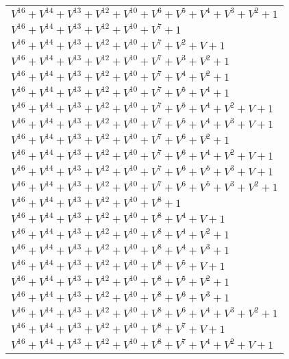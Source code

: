 \documentclass[12pt]{article}
\begin{document}
\begin{adjustwidth}{-4cm}{}
\begin{center}
\begin{longtable}{|l|}
$V^{16}  +V^{14}  +V^{13}  +V^{12}  +V^{10}  +V^{6}  +V^{5}  +V^{4}  +V^{3}  +V^{2}  + 1$ \\
$V^{16}  +V^{14}  +V^{13}  +V^{12}  +V^{10}  +V^{7}  + 1$ \\
$V^{16}  +V^{14}  +V^{13}  +V^{12}  +V^{10}  +V^{7}  +V^{2}  + V + 1$ \\
$V^{16}  +V^{14}  +V^{13}  +V^{12}  +V^{10}  +V^{7}  +V^{3}  +V^{2}  + 1$ \\
$V^{16}  +V^{14}  +V^{13}  +V^{12}  +V^{10}  +V^{7}  +V^{4}  +V^{2}  + 1$ \\
$V^{16}  +V^{14}  +V^{13}  +V^{12}  +V^{10}  +V^{7}  +V^{5}  +V^{4}  + 1$ \\
$V^{16}  +V^{14}  +V^{13}  +V^{12}  +V^{10}  +V^{7}  +V^{5}  +V^{4}  +V^{2}  + V + 1$ \\
$V^{16}  +V^{14}  +V^{13}  +V^{12}  +V^{10}  +V^{7}  +V^{5}  +V^{4}  +V^{3}  + V + 1$ \\
$V^{16}  +V^{14}  +V^{13}  +V^{12}  +V^{10}  +V^{7}  +V^{6}  +V^{2}  + 1$ \\
$V^{16}  +V^{14}  +V^{13}  +V^{12}  +V^{10}  +V^{7}  +V^{6}  +V^{4}  +V^{2}  + V + 1$ \\
$V^{16}  +V^{14}  +V^{13}  +V^{12}  +V^{10}  +V^{7}  +V^{6}  +V^{5}  +V^{3}  + V + 1$ \\
$V^{16}  +V^{14}  +V^{13}  +V^{12}  +V^{10}  +V^{7}  +V^{6}  +V^{5}  +V^{3}  +V^{2}  + 1$ \\
$V^{16}  +V^{14}  +V^{13}  +V^{12}  +V^{10}  +V^{8}  + 1$ \\
$V^{16}  +V^{14}  +V^{13}  +V^{12}  +V^{10}  +V^{8}  +V^{4}  + V + 1$ \\
$V^{16}  +V^{14}  +V^{13}  +V^{12}  +V^{10}  +V^{8}  +V^{4}  +V^{2}  + 1$ \\
$V^{16}  +V^{14}  +V^{13}  +V^{12}  +V^{10}  +V^{8}  +V^{4}  +V^{3}  + 1$ \\
$V^{16}  +V^{14}  +V^{13}  +V^{12}  +V^{10}  +V^{8}  +V^{5}  + V + 1$ \\
$V^{16}  +V^{14}  +V^{13}  +V^{12}  +V^{10}  +V^{8}  +V^{5}  +V^{2}  + 1$ \\
$V^{16}  +V^{14}  +V^{13}  +V^{12}  +V^{10}  +V^{8}  +V^{6}  +V^{3}  + 1$ \\
$V^{16}  +V^{14}  +V^{13}  +V^{12}  +V^{10}  +V^{8}  +V^{6}  +V^{4}  +V^{3}  +V^{2}  + 1$ \\
$V^{16}  +V^{14}  +V^{13}  +V^{12}  +V^{10}  +V^{8}  +V^{7}  + V + 1$ \\
$V^{16}  +V^{14}  +V^{13}  +V^{12}  +V^{10}  +V^{8}  +V^{7}  +V^{4}  +V^{2}  + V + 1$ \\

\end{longtable}
\end{center}
\end{adjustwidth}
\end{document}
